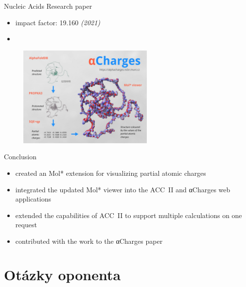 \documentclass[
]{beamer}
\begin{document}
\section[]{}

\begin{frame}{Nucleic Acids Research paper}
  \begin{itemize}
    \item impact factor: 19.160 \textit{(2021)}
    \item {}
  \end{itemize}
  \begin{figure}
    \includegraphics[width=0.6\textwidth,keepaspectratio]{images/alpha-charges-visualization.jpeg}
  \end{figure}
\end{frame}

\begin{frame}{Conclusion}
  \begin{itemize}
    \item created an Mol* extension for visualizing partial atomic charges
    \item integrated the updated Mol* viewer into the ACC~II and αCharges web applications
    \item extended the capabilities of ACC~II to support multiple calculations on one request
    \item contributed with the work to the αCharges paper
  \end{itemize}
\end{frame}

\section{Otázky oponenta}
\end{document}
